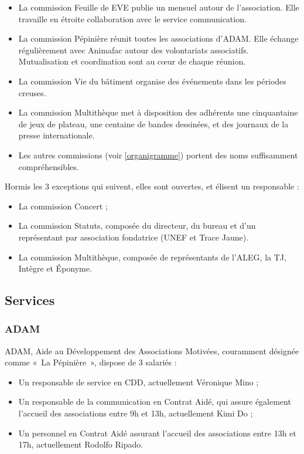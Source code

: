 \begin{itemize}
\item La commission Feuille de EVE publie un mensuel autour de l'association. Elle travaille
      en étroite collaboration avec le service communication.
\item La commission Pépinière réunit toutes les associations d'ADAM. Elle échange
      régulièrement avec Animafac autour des volontariats associatifs. Mutualisation
      et coordination sont au cœur de chaque réunion.
\item La commission Vie du bâtiment organise des événements dans les périodes creuses.
\item La commission Multithèque met à disposition des adhérents une cinquantaine
      de jeux de plateau, une centaine de bandes dessinées,
      et des journaux de la presse internationale.
\item Les autres commissions (voir \ref{organigramme}) portent des noms suffisamment compréhensibles.
\end{itemize}

Hormis les 3 exceptions qui suivent, elles sont ouvertes,
et élisent un responsable :

\begin{itemize}
\item La commission Concert ;
\item La commission Statuts, composée du directeur, du bureau et d'un représentant par
       association fondatrice (UNEF et Trace Jaune).
\item La commission Multithèque, composée de représentants de l'ALEG, la TJ, Intègre et Éponyme.
\end{itemize}


\subsection{Services}

\subsubsection{ADAM}

ADAM, Aide au Développement des Associations Motivées, couramment désignée
comme «~La Pépinière~», dispose de 3 salariés :
\begin{itemize}
\item Un responsable de service en CDD, actuellement Véronique Mino ;
\item Un responsable de la communication en Contrat Aidé, qui assure également l'accueil
      des associations entre 9h et 13h, actuellement Kimi Do ;
\item Un personnel en Contrat Aidé assurant l'accueil des associations entre 13h et 17h,
      actuellement Rodolfo Ripado.
\end{itemize}

